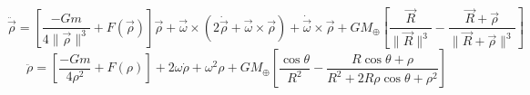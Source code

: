 \documentclass[letterpaper, preprint, paper,11pt]{AAS}
\begin{document}
\begin{equation}
\ddot{\vec{\rho}} = \left[\frac{-Gm}{4\|\vec{\rho}\|^{3}}+F(\vec{\rho})\right]\vec{\rho}+\vec{\omega}\times(2\dot{\vec{\rho}}+\vec{\omega}\times\vec{\rho})+\dot{\vec{\omega}}\times\vec{\rho}+{GM_\oplus}\left[\frac{\vec{R}}{\|\vec{R}\|^{3}}-\frac{\vec{R}+\vec{\rho}}{\|\vec{R}+\vec{\rho}\|^{3}}\right]
\end{equation}
\begin{equation}
\ddot{\rho} = \left[\frac{-Gm}{4\rho^{2}}+F(\rho)\right]+2\omega\dot{\rho}+\omega^{2}\rho+{GM_\oplus}\left[\frac{\cos\theta}{R^{2}}-\frac{R\cos\theta+\rho}{R^{2}+2R\rho\cos\theta+\rho^{2}}\right]
\end{equation}
\end{document}
